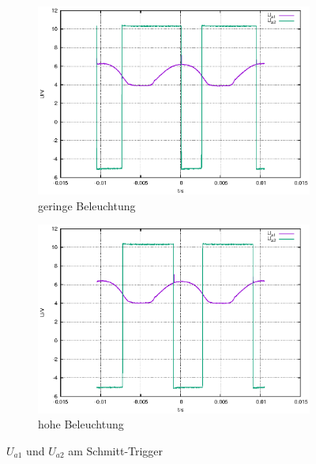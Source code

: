 \documentclass[10pt,a4paper]{scrartcl}
\begin{document}
\begin{figure}[!ht]
    \begin{subfigure}{0.5\textwidth}
        \includegraphics[width=\textwidth]{graphics/plot_SSW_low.eps}
        \caption{geringe Beleuchtung}
    \end{subfigure}
    \begin{subfigure}{0.5\textwidth}
        \includegraphics[width=\textwidth]{graphics/plot_SSW_high.eps}
        \caption{hohe Beleuchtung}
    \end{subfigure}
    \caption{$U_{a1}$ und $U_{a2}$ am Schmitt-Trigger}
    \label{fig:plot_schmitt}
\end{figure}
\end{document}
